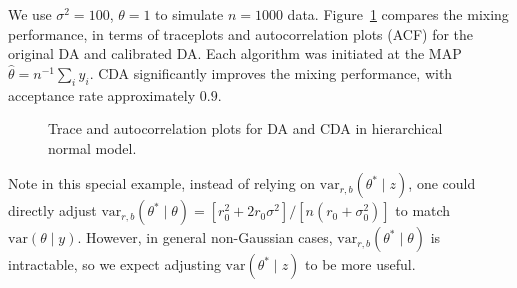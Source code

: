 \documentclass[twoside,11pt]{article}
\newcommand{\1}{\mathbf 1}
\begin{document}
{We use $\sigma^2=100$, $\theta=1$ to simulate  $n=1000$ data. Figure~\ref{plot_hierarchical_normal} compares the mixing performance, in terms of traceplots and autocorrelation plots (ACF) for the original DA and calibrated DA. Each algorithm was initiated at the MAP $\hat\theta= n^{-1}\sum_iy_i$. CDA significantly improves the mixing performance, with acceptance rate approximately $0.9$.

\begin{figure}[H]
  {%
  }
    {\caption{Trace and autocorrelation plots for DA and CDA in hierarchical normal model.\label{plot_hierarchical_normal}
}}
\end{figure}



Note in this special example, instead of relying on $\mbox{var}_{r,b}(\theta^*\mid z)$, one could directly adjust $ \mbox{var}_{r,b}(\theta^*\mid \theta)=[r_0^2 + 2r_0 \sigma^2]/[n(r_0+\sigma_0^2)]$ to match $ \mbox{var}(\theta\mid y)$. However, in general non-Gaussian cases, $\mbox{var}_{r,b}(\theta^*\mid \theta)$ is intractable, so we expect adjusting $\mbox{var}(\theta^*\mid z)$ to be more useful.


}
\end{document}
